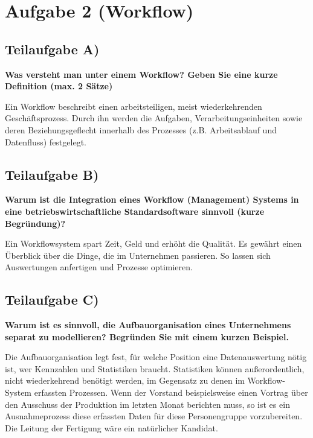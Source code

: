 \section{Aufgabe 2 (Workflow)}

\subsection{Teilaufgabe A)}
\textbf{Was versteht man unter einem Workflow? Geben Sie eine kurze Definition (max. 2
Sätze)}

Ein Workflow beschreibt einen arbeitsteiligen, meist wiederkehrenden
Geschäftsprozess. Durch ihn werden die Aufgaben, Verarbeitungseinheiten sowie
deren Beziehungsgeflecht innerhalb des Prozesses (z.B. Arbeitsablauf und
Datenfluss) festgelegt.

\subsection{Teilaufgabe B)}
\textbf{Warum ist die Integration eines Workflow (Management) Systems in eine
betriebswirtschaftliche Standardsoftware sinnvoll (kurze Begründung)?}

Ein Workflowsystem spart Zeit, Geld und erhöht die Qualität. Es gewährt
einen Überblick über die Dinge, die im Unternehmen passieren. So lassen sich
Auswertungen anfertigen und Prozesse optimieren.

\subsection{Teilaufgabe C)}
\textbf{Warum ist es sinnvoll, die Aufbauorganisation eines Unternehmens separat zu
modellieren? Begründen Sie mit einem kurzen Beispiel.}

Die Aufbauorganisation legt fest, für welche Position eine Datenauswertung
nötig ist, wer Kennzahlen und Statistiken braucht. Statistiken können
außerordentlich, nicht wiederkehrend benötigt werden, im Gegensatz zu denen im
Workflow- System erfassten Prozessen. Wenn der Vorstand beispielsweise einen
Vortrag über den Ausschuss der Produktion im letzten Monat berichten muss, so
ist es ein Ausnahmeprozess diese erfassten Daten für diese Personengruppe
vorzubereiten. Die Leitung der Fertigung wäre ein natürlicher Kandidat. 

\clearpage